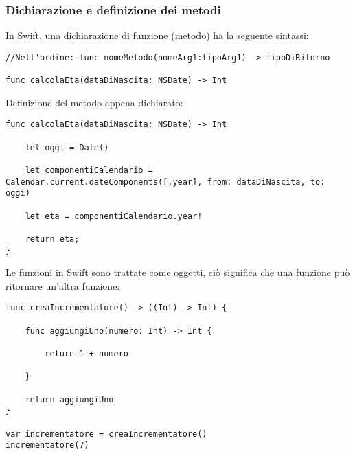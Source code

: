 \subsubsection{Dichiarazione e definizione dei metodi}
In Swift, una dichiarazione di funzione (metodo) ha la seguente sintassi: 
\begin{lstlisting}
//Nell'ordine: func nomeMetodo(nomeArg1:tipoArg1) -> tipoDiRitorno

func calcolaEta(dataDiNascita: NSDate) -> Int

\end{lstlisting}
Definizione del metodo appena dichiarato: 
\begin{lstlisting}
func calcolaEta(dataDiNascita: NSDate) -> Int

	let oggi = Date()
      
    let componentiCalendario = Calendar.current.dateComponents([.year], from: dataDiNascita, to: oggi)                             			
	
	let eta = componentiCalendario.year!
	
	return eta;
}
\end{lstlisting}
Le funzioni in Swift sono trattate come oggetti, ciò significa che una funzione può ritornare un'altra funzione: 
\begin{lstlisting}
func creaIncrementatore() -> ((Int) -> Int) {
	
	func aggiungiUno(numero: Int) -> Int {
	
		return 1 + numero 
	
	}
	
	return aggiungiUno
}

var incrementatore = creaIncrementatore()
incrementatore(7)
\end{lstlisting}
